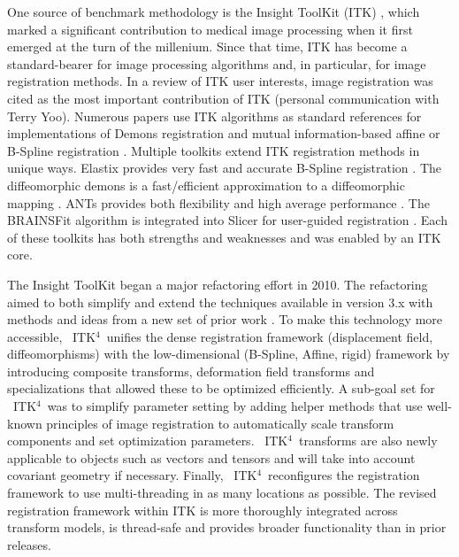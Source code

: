 \documentclass{frontiersSCNS}
\newcommand{\tk}{~ITK$^{\text{4}}$~}
\begin{document}
One source of benchmark methodology is the Insight ToolKit (ITK)
\cite{Yoo2002,Ackerman2003}, which marked a significant contribution to
medical image processing when it first emerged at the turn of the millenium.
Since that time, ITK has become a standard-bearer for image
processing algorithms and, in particular, for image registration
methods.  In a review of ITK user interests, image registration was cited as the most important
contribution of ITK (personal communication with Terry Yoo).  Numerous papers use ITK
algorithms as standard references for implementations of Demons
registration and mutual information-based affine or B-Spline
registration \cite{2004,Shelton2005,Floca2007,Chen2008,Cheung2009}.
Multiple toolkits extend ITK registration methods in unique ways.
Elastix provides very fast and accurate B-Spline registration
\cite{Klein2010,Murphy2011}.  The diffeomorphic demons is a fast/efficient
approximation to a diffeomorphic mapping \cite{Vercauteren2009}.  
ANTs provides both flexibility and high average performance
\cite{Avants2011}.  The BRAINSFit algorithm is integrated into Slicer
for user-guided registration \cite{Kikinis2011}.
Each of these toolkits has both strengths and weaknesses
\cite{Klein2010,Murphy2011} and was enabled by an ITK core.    

The Insight ToolKit began a major refactoring effort in 2010.
The refactoring aimed to both simplify and extend the techniques available in version
3.x with methods and ideas from a new set of prior work
\cite{Jenkinson2001,Christensen1996,Rueckert1999,Miller2005,Peyrat2010,Avants2011}.
To make this technology more accessible, \tk unifies the dense
registration framework (displacement field, diffeomorphisms)
with the low-dimensional (B-Spline, Affine, rigid) framework by
introducing composite transforms, deformation field transforms and
specializations that allowed these to be optimized efficiently.  A sub-goal set for \tk was to simplify
parameter setting by adding helper methods that use well-known
principles of image registration to automatically scale transform
components and set optimization parameters.  \tk transforms are also
newly applicable to objects such as vectors and tensors and will take into account covariant geometry if
necessary.  Finally, \tk reconfigures the registration framework
to use multi-threading in as many locations as possible.
The revised registration framework within ITK is more thoroughly
integrated across transform models, is thread-safe and provides
broader functionality than in prior releases. 
\end{document}
